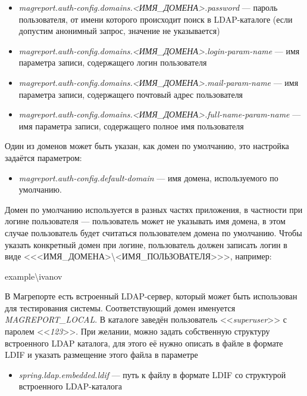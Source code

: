 \documentclass[../user-manual.tex]{subfiles}
\begin{document}
\begin{itemize}
		\item \textit{magreport.auth-config.domains.<ИМЯ\_ДОМЕНА>.password} --- пароль пользователя, от имени которого происходит поиск в LDAP-каталоге (если допустим анонимный запрос, значение не указывается)
		
		\item \textit{magreport.auth-config.domains.<ИМЯ\_ДОМЕНА>.login-param-name} --- имя параметра записи, содержащего логин пользователя
		
		\item \textit{magreport.auth-config.domains.<ИМЯ\_ДОМЕНА>.mail-param-name} --- имя параметра записи, содержащего почтовый адрес пользователя
		
		\item \textit{magreport.auth-config.domains.<ИМЯ\_ДОМЕНА>.full-name-param-name} --- имя параметра записи, содержащего полное имя пользователя
		
	\end{itemize}

	Один из доменов может быть указан, как домен по умолчанию, это настройка задаётся параметром:
	
	\begin{itemize}
		\item \textit{magreport.auth-config.default-domain} --- имя домена, используемого по умолчанию.
	\end{itemize}

	Домен по умолчанию используется в разных частях приложения, в частности при логине пользователя --- пользователь может не указывать имя домена, в этом случае пользователь будет считаться пользователем домена по умолчанию. Чтобы указать конкретный домен при логине, пользователь должен записать логин в виде <<<ИМЯ\_ДОМЕНА>\textbackslash<ИМЯ\_ПОЛЬЗОВАТЕЛЯ>>>, например:
	
	\begin{center}
		example\textbackslash ivanov
	\end{center}

	В Магрепорте есть встроенный LDAP-сервер, который может быть использован для тестирования системы. Соответствующий домен именуется \textit{MAGREPORT\_LOCAL}. В каталоге заведён пользователь <<\textit{superuser}>> с паролем <<\textit{123}>>. При желании, можно задать собственную структуру встроенного LDAP каталога, для этого её нужно описать в файле в формате LDIF и указать размещение этого файла в параметре
	
	\begin{itemize}
		\item \textit{spring.ldap.embedded.ldif} --- путь к файлу в формате LDIF со структурой встроенного LDAP-каталога
	\end{itemize}
\end{document}
